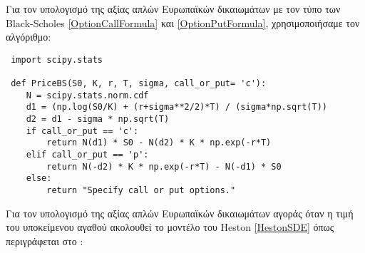 \documentclass[12pt,a4paper,twoside,openany]{book}
\begin{document}
	\vspace{4mm}  	
 	Για τον υπολογισμό της αξίας απλών Ευρωπαϊκών δικαιωμάτων με τον τύπο των Black-Scholes \eqref{OptionCallFormula} και \eqref{OptionPutFormula}, χρησιμοποιήσαμε τον αλγόριθμο:
 	\vspace{4mm}
\begin{lstlisting}
 import scipy.stats
 
 def PriceBS(S0, K, r, T, sigma, call_or_put= 'c'):
 	N = scipy.stats.norm.cdf
 	d1 = (np.log(S0/K) + (r+sigma**2/2)*T) / (sigma*np.sqrt(T))
 	d2 = d1 - sigma * np.sqrt(T)
 	if call_or_put == 'c':
 		return N(d1) * S0 - N(d2) * K * np.exp(-r*T)
 	elif call_or_put == 'p':
 		return N(-d2) * K * np.exp(-r*T) - N(-d1) * S0
 	else:
 		return "Specify call or put options." \end{lstlisting}
 	\vspace{4mm}
 	Για τον υπολογισμό της αξίας απλών Ευρωπαϊκών δικαιωμάτων αγοράς όταν η τιμή του υποκείμενου αγαθού ακολουθεί το μοντέλο του Heston \eqref{HestonSDE} όπως περιγράφεται στο \cite{Heston}:
\end{document}
